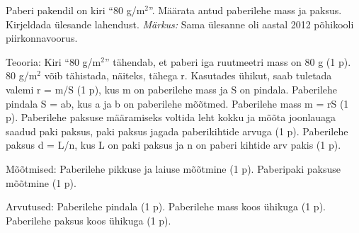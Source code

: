 
Paberi pakendil on kiri ``80 g/m$^2$''. Määrata antud paberilehe mass ja paksus. Kirjeldada ülesande lahendust.
\textit{Märkus:} Sama ülesanne oli aastal 2012 põhikooli piirkonnavoorus.

\hint

\solu
Teooria: Kiri ``80 g/m$^2$'' tähendab, et paberi iga ruutmeetri mass on 80 g (1 p). 80 g/m$^2$ võib tähistada, näiteks, tähega r. Kasutades ühikut, saab tuletada valemi r = m/S (1 p), kus m on paberilehe mass ja S on pindala. Paberilehe pindala S = ab, kus a ja b on paberilehe mõõtmed. Paberilehe mass m = rS (1 p). Paberilehe paksuse määramiseks voltida leht kokku ja mõõta joonlauaga saadud paki paksus, paki paksus jagada paberikihtide arvuga (1 p). Paberilehe paksus d = L/n, kus L on paki paksus ja n on paberi kihtide arv pakis (1 p).

Mõõtmised: Paberilehe pikkuse ja laiuse mõõtmine (1 p). Paberipaki paksuse mõõtmine (1 p).

Arvutused: Paberilehe pindala (1 p). Paberilehe mass koos ühikuga (1 p). Paberilehe paksus koos ühikuga (1 p).
\probend
